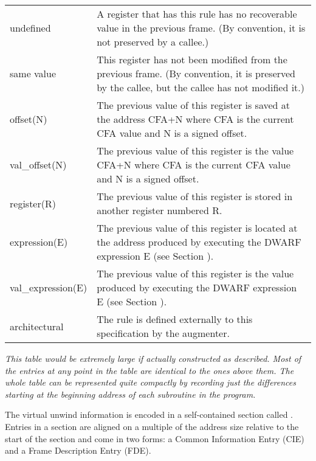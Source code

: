 \begin{longtable}{lP{9cm}}
undefined 
&A register that has this rule has no recoverable value in the previous frame.
(By convention, it is not preserved by a callee.) \\

same value
&This register has not been modified from the previous frame. (By convention,
it is preserved by the callee, but the callee has not modified it.) \\

offset(N)
&The previous value of this register is saved at the address CFA+N where CFA
is the current CFA value and N is a signed offset.\\

val\_offset(N)
&The previous value of this register is the value CFA+N where CFA is the
current CFA value and N is a signed offset.\\

register(R)
&The previous value of this register is stored 
in another register numbered R.\\

expression(E)
&The previous value of this register is located at the address produced by
executing the DWARF expression E (see Section ).\\

val\_expression(E) 
&The previous value of this register is the value produced by executing the
DWARF expression E (see Section ).\\

architectural
&The rule is defined externally to this specification by the augmenter.\\

\end{longtable}

\textit{This table would be extremely large if actually constructed
as described. Most of the entries at any point in the table
are identical to the ones above them. The whole table can be
represented quite compactly by recording just the differences
starting at the beginning address of each subroutine in
the program.}

The virtual unwind information is encoded in a self-contained
section called 
\dotdebugframe{}.  Entries in a 
\dotdebugframe{} section
are aligned on a multiple of the address size relative to
the start of the section and come in two forms: a Common
Information Entry (CIE) and a 
Frame Description Entry (FDE).

